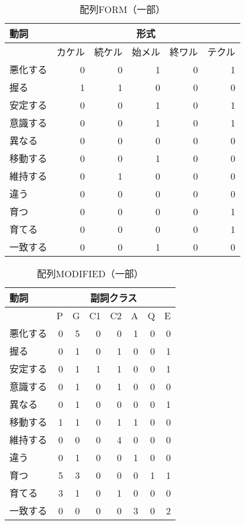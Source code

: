 \vspace*{50mm}
\begin{table}[hbt]
\caption{配列FORM（一部）}
\label{tab:form2}
\centering
\begin{tabular}{|l|r|r|r|r|r|}  \hline
動詞      & \multicolumn{5}{|c|}{形式}            \\ \hline
          & カケル & 続ケル & 始メル & 終ワル & テクル \\ \hline \hline
悪化する & 0 & 0 & 1 & 0 & 1 \\ \hline
握る     & 1 & 1 & 0 & 0 & 0 \\ \hline
安定する & 0 & 0 & 1 & 0 & 1 \\ \hline
意識する & 0 & 0 & 1 & 0 & 1 \\ \hline
異なる   & 0 & 0 & 0 & 0 & 0 \\ \hline
移動する & 0 & 0 & 1 & 0 & 0 \\ \hline
維持する & 0 & 1 & 0 & 0 & 0 \\ \hline
違う     & 0 & 0 & 0 & 0 & 0 \\ \hline
育つ     & 0 & 0 & 0 & 0 & 1 \\ \hline
育てる   & 0 & 0 & 0 & 0 & 1 \\ \hline
一致する & 0 & 0 & 1 & 0 & 0 \\ \hline
\end{tabular}
\end{table}

\clearpage
\begin{table}[htb]
\caption{配列MODIFIED（一部）}
\label{tab:modified}
\centering
\begin{tabular}{|l|r|r|r|r|r|r|r|}  \hline
動詞       &  \multicolumn{7}{|c|}{副詞クラス}            \\ \hline
          & {\sf P} & {\sf G} & {\sf C1} & {\sf C2} & {\sf A} & {\sf Q} & {\sf E} \\ \hline \hline
悪化する & 0 & 5 & 0 & 0 & 1 & 0 & 0 \\ \hline
握る     & 0 & 1 & 0 & 1 & 0 & 0 & 1 \\ \hline
安定する & 0 & 1 & 1 & 1 & 0 & 0 & 1 \\ \hline
意識する & 0 & 1 & 0 & 1 & 0 & 0 & 0 \\ \hline
異なる   & 0 & 1 & 0 & 0 & 0 & 0 & 1 \\ \hline
移動する & 1 & 1 & 0 & 1 & 1 & 0 & 0 \\ \hline
維持する & 0 & 0 & 0 & 4 & 0 & 0 & 0 \\ \hline
違う     & 0 & 1 & 0 & 0 & 1 & 0 & 0 \\ \hline
育つ     & 5 & 3 & 0 & 0 & 0 & 1 & 1 \\ \hline
育てる   & 3 & 1 & 0 & 1 & 0 & 0 & 0 \\ \hline
一致する & 0 & 0 & 0 & 0 & 3 & 0 & 2 \\ \hline
\end{tabular}
\end{table}

